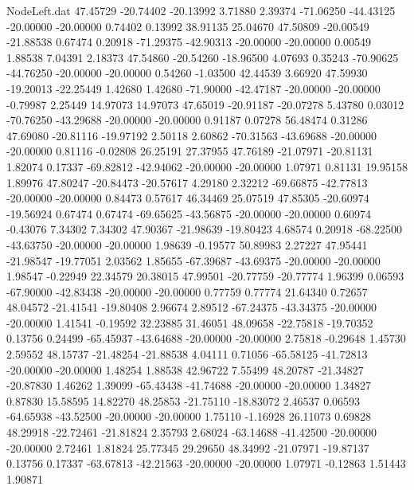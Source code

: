 \begin{filecontents}{NodeLeft.dat}
  47.45729  -20.74402  -20.13992     3.71880    2.39374  -71.06250  -44.43125  -20.00000  -20.00000    0.74402    0.13992   38.91135   25.04670
  47.50809  -20.00549  -21.88538     0.67474    0.20918  -71.29375  -42.90313  -20.00000  -20.00000    0.00549    1.88538    7.04391    2.18373
  47.54860  -20.54260  -18.96500     4.07693    0.35243  -70.90625  -44.76250  -20.00000  -20.00000    0.54260   -1.03500   42.44539    3.66920
  47.59930  -19.20013  -22.25449     1.42680    1.42680  -71.90000  -42.47187  -20.00000  -20.00000   -0.79987    2.25449   14.97073   14.97073
  47.65019  -20.91187  -20.07278     5.43780    0.03012  -70.76250  -43.29688  -20.00000  -20.00000    0.91187    0.07278   56.48474    0.31286
  47.69080  -20.81116  -19.97192     2.50118    2.60862  -70.31563  -43.69688  -20.00000  -20.00000    0.81116   -0.02808   26.25191   27.37955
  47.76189  -21.07971  -20.81131     1.82074    0.17337  -69.82812  -42.94062  -20.00000  -20.00000    1.07971    0.81131   19.95158    1.89976
  47.80247  -20.84473  -20.57617     4.29180    2.32212  -69.66875  -42.77813  -20.00000  -20.00000    0.84473    0.57617   46.34469   25.07519
  47.85305  -20.60974  -19.56924     0.67474    0.67474  -69.65625  -43.56875  -20.00000  -20.00000    0.60974   -0.43076    7.34302    7.34302
  47.90367  -21.98639  -19.80423     4.68574    0.20918  -68.22500  -43.63750  -20.00000  -20.00000    1.98639   -0.19577   50.89983    2.27227
  47.95441  -21.98547  -19.77051     2.03562    1.85655  -67.39687  -43.69375  -20.00000  -20.00000    1.98547   -0.22949   22.34579   20.38015
  47.99501  -20.77759  -20.77774     1.96399    0.06593  -67.90000  -42.83438  -20.00000  -20.00000    0.77759    0.77774   21.64340    0.72657
  48.04572  -21.41541  -19.80408     2.96674    2.89512  -67.24375  -43.34375  -20.00000  -20.00000    1.41541   -0.19592   32.23885   31.46051
  48.09658  -22.75818  -19.70352     0.13756    0.24499  -65.45937  -43.64688  -20.00000  -20.00000    2.75818   -0.29648    1.45730    2.59552
  48.15737  -21.48254  -21.88538     4.04111    0.71056  -65.58125  -41.72813  -20.00000  -20.00000    1.48254    1.88538   42.96722    7.55499
  48.20787  -21.34827  -20.87830     1.46262    1.39099  -65.43438  -41.74688  -20.00000  -20.00000    1.34827    0.87830   15.58595   14.82270
  48.25853  -21.75110  -18.83072     2.46537    0.06593  -64.65938  -43.52500  -20.00000  -20.00000    1.75110   -1.16928   26.11073    0.69828
  48.29918  -22.72461  -21.81824     2.35793    2.68024  -63.14688  -41.42500  -20.00000  -20.00000    2.72461    1.81824   25.77345   29.29650
  48.34992  -21.07971  -19.87137     0.13756    0.17337  -63.67813  -42.21563  -20.00000  -20.00000    1.07971   -0.12863    1.51443    1.90871

\end{filecontents}
